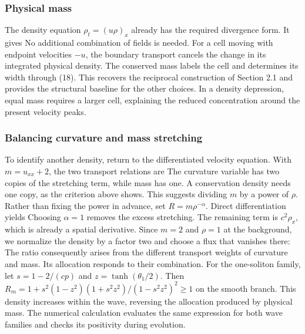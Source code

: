\subsubsection*{Physical mass}

The density equation \(\rho_t=(u\rho)_x\) already has the required divergence form. It gives
No additional combination of fields is needed. For a cell moving with endpoint velocities \(-u\), the boundary transport cancels the change in its integrated physical density. The conserved mass labels the cell and determines its width through (18). This recovers the reciprocal construction of Section 2.1 and provides the structural baseline for the other choices. In a density depression, equal mass requires a larger cell, explaining the reduced concentration around the present velocity peaks.

\subsubsection*{Balancing curvature and mass stretching}

To identify another density, return to the differentiated velocity equation. With \(m=u_{xx}+2\), the two transport relations are
The curvature variable has two copies of the stretching term, while mass has one. A conservation density needs one copy, as the criterion above shows. This suggests dividing \(m\) by a power of \(\rho\). Rather than fixing the power in advance, set \(R=m\rho^{-\alpha}\). Direct differentiation yields
Choosing \(\alpha=1\) removes the excess stretching. The remaining term is \(c^2\rho_x\), which is already a spatial derivative. Since \(m=2\) and \(\rho=1\) at the background, we normalize the density by a factor two and choose a flux that vanishes there:
The ratio consequently arises from the different transport weights of curvature and mass. Its allocation responds to their combination. For the one-soliton family, let \(s=1-2/(cp)\) and \(z=\tanh(\theta_1/2)\). Then \(R_m=1+s^2(1-z^2)(1+s^2z^2)/(1-s^2z^2)^2\geq1\) on the smooth branch. This density increases within the wave, reversing the allocation produced by physical mass. The numerical calculation evaluates the same expression for both wave families and checks its positivity during evolution.

